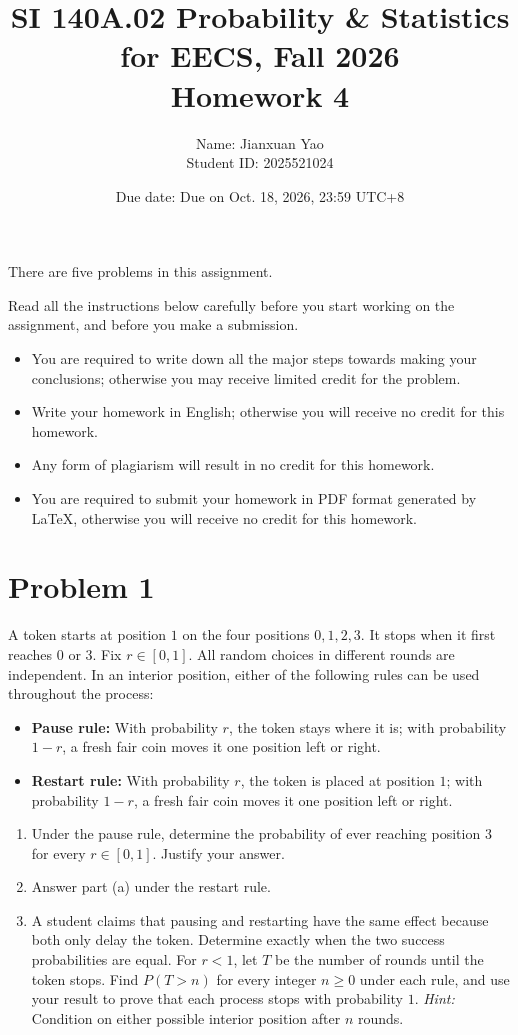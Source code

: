 \documentclass[11pt,a4paper]{article}
\title{SI 140A.02 Probability \& Statistics for EECS, Fall 2026\\[0.4em]Homework 4}
\author{Name: Jianxuan Yao \\ Student ID: 2025521024}
\date{
Due date: Due on Oct. 18, 2026, 23:59 UTC+8}
\newcommand{\Prob}{P}
\begin{document}
\maketitle
\thispagestyle{plain}
\vspace{1em}
There are five problems in this assignment.

Read all the instructions below carefully before you start working on the assignment, and before you make a submission.
\begin{itemize}
\item You are required to write down all the major steps towards making your conclusions; otherwise you may receive limited credit for the problem.
\item Write your homework in English; otherwise you will receive no credit for this homework.
\item Any form of plagiarism will result in no credit for this homework.
\item You are required to submit your homework in PDF format generated by LaTeX, otherwise you will receive no credit for this homework.
\end{itemize}

\clearpage
\section*{Problem 1}
A token starts at position $1$ on the four positions $0,1,2,3$. It stops when it first reaches $0$ or $3$. Fix $r\in[0,1]$. All random choices in different rounds are independent. In an interior position, either of the following rules can be used throughout the process:
\begin{itemize}
\item \textbf{Pause rule:} With probability $r$, the token stays where it is; with probability $1-r$, a fresh fair coin moves it one position left or right.
\item \textbf{Restart rule:} With probability $r$, the token is placed at position $1$; with probability $1-r$, a fresh fair coin moves it one position left or right.
\end{itemize}
\begin{enumerate}
\item Under the pause rule, determine the probability of ever reaching position $3$ for every $r\in[0,1]$. Justify your answer.
\item Answer part (a) under the restart rule.
\item A student claims that pausing and restarting have the same effect because both only delay the token. Determine exactly when the two success probabilities are equal. For $r<1$, let $T$ be the number of rounds until the token stops. Find $\Prob(T>n)$ for every integer $n\geq0$ under each rule, and use your result to prove that each process stops with probability $1$. \emph{Hint:} Condition on either possible interior position after $n$ rounds.
\end{enumerate}
\end{document}
